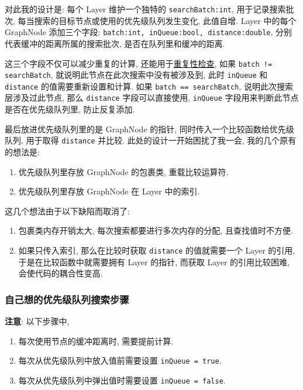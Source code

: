 对此我的设计是:
每个 Layer 维护一个独特的 \texttt{searchBatch:int}, 用于记录搜索批次, 每当搜索的目标节点或使用的优先级队列发生变化,
此值自增.
Layer 中的每个 GraphNode 添加三个字段: \texttt{{batch:int, inQueue:bool, distance:double}},
分别代表缓冲的距离所属的搜索批次, 是否在队列里和缓冲的距离.

这三个字段不仅可以减少重复的计算, 还能用于\hyperref[repetitive-inspection]{重复性检查},
如果 \texttt{batch != searchBatch}, 就说明此节点在此次搜索中没有被涉及到,
此时 \texttt{inQueue} 和 \texttt{distance} 的值需要重新设置和计算.
如果 \texttt{batch == searchBatch}, 说明此次搜索层涉及过此节点, 那么 \texttt{distance} 字段可以直接使用, \texttt{inQueue}
字段用来判断此节点是否在优先级队列里, 防止反复添加.

最后放进优先级队列里的是 GraphNode 的指针, 同时传入一个比较函数给优先级队列, 用于取得 \texttt{distance} 并比较.
此处的设计一开始困扰了我一会, 我的几个原有的想法是:

\begin{enumerate}
    \item 优先级队列里存放 GraphNode 的包裹类, 重载比较运算符.
    \item 优先级队列里存放 GraphNode 在 Layer 中的索引.
\end{enumerate}

这几个想法由于以下缺陷而取消了:

\begin{enumerate}
    \item 包裹类内存开销太大, 每次搜索都要进行多次内存的分配, 且查找值时不方便.
    \item 如果只传入索引, 那么在比较时获取 \texttt{distance} 的值就需要一个 Layer 的引用, 于是在比较函数中就需要拥有 Layer 的指针,
    而获取 Layer 的引用比较困难, 会使代码的耦合性变高.
\end{enumerate}

\subsubsection{自己想的优先级队列搜索步骤}

\textbf{注意}:
以下步骤中,

\begin{enumerate}
    \item 每次使用节点的缓冲距离时, 需要提前计算.
    \item 每次从优先级队列中放入值前需要设置 \texttt{inQueue = true}.
    \item 每次从优先级队列中弹出值时需要设置 \texttt{inQueue = false}.
\end{enumerate}


